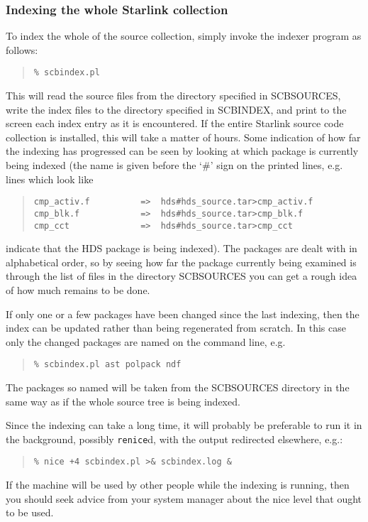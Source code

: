 \documentclass[twoside,11pt]{article}
\renewcommand{\_}{\texttt{\symbol{95}}}
\begin{document}
\subsubsection{Indexing the whole Starlink collection}

To index the whole of the source collection, simply invoke the 
indexer program as follows:
\begin{quote}
\begin{verbatim}
% scbindex.pl
\end{verbatim}
\end{quote}
This will 
read the source files from the directory specified in SCB\_SOURCES, 
write the index files to the directory specified in SCB\_INDEX,
and print to the screen each index entry as it is encountered.
If the entire Starlink source code collection is installed, 
this will take a matter of hours.  Some indication of how far the indexing
has progressed can be seen by looking at which package is currently
being indexed (the name is given before the `\#' sign on the 
printed lines, e.g. lines which look like
\begin{quote}
\begin{verbatim}
cmp_activ.f          =>  hds#hds_source.tar>cmp_activ.f
cmp_blk.f            =>  hds#hds_source.tar>cmp_blk.f
cmp_cct              =>  hds#hds_source.tar>cmp_cct
\end{verbatim}
\end{quote}
indicate that the HDS package is being indexed).
The packages are dealt with in alphabetical order, so by seeing how 
far the package currently being examined is through the list of files
in the directory SCB\_SOURCES you can get a rough idea of how much remains
to be done.

If only one or a few packages have been changed
since the last indexing,
then the index can be updated rather than being regenerated from scratch.
In this case only the changed packages are named on the command line,
e.g.
\begin{quote}
\begin{verbatim}
% scbindex.pl ast polpack ndf
\end{verbatim}
\end{quote}
The packages so named will be taken from the SCB\_SOURCES directory in
the same way as if the whole source tree is being indexed.

Since the indexing can take a long time, it will probably be preferable to 
run it in the background, possibly {\tt renice}d, with the output
redirected elsewhere, e.g.:
\begin{quote}
\begin{verbatim}
% nice +4 scbindex.pl >& scbindex.log &
\end{verbatim}
\end{quote}
If the machine will be used by other people while the indexing 
is running, then you should seek advice from your system manager 
about the nice level that ought to be used.
\end{document}
